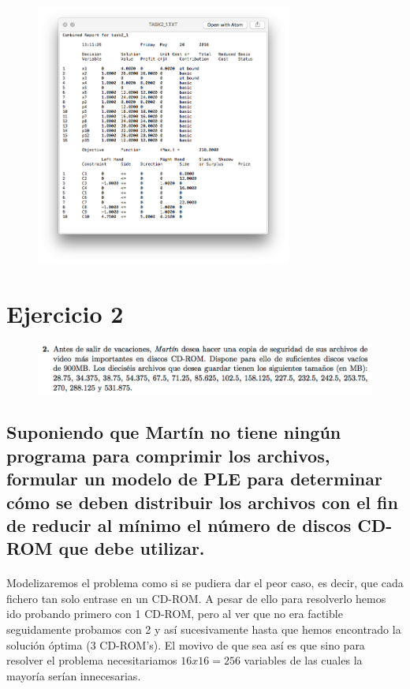 \documentclass[10pt, a4paper]{article}
\begin{document}
			\paragraph{}
			\begin{figure}[H]
			\centering
				\includegraphics[width=0.75\textwidth]{res/exercise-1-result.png}
			\end{figure}


	\section{Ejercicio 2}

        \begin{figure}[H]
        \centering
            \includegraphics[width=\textwidth]{res/exercise-2.png}
        \end{figure}


		\subsection{Suponiendo que Martín no tiene ningún programa para comprimir los archivos, formular un modelo de PLE para determinar cómo se deben distribuir los archivos con el fin de reducir al mínimo el número de discos CD-ROM que debe utilizar.}

			\paragraph{}
			Modelizaremos el problema como si se pudiera dar el peor caso, es decir, que cada fichero tan solo entrase en un CD-ROM. A pesar de ello para resolverlo hemos ido probando primero con 1 CD-ROM, pero al ver que no era factible seguidamente probamos con 2 y así sucesivamente hasta que hemos encontrado la solución óptima (3 CD-ROM's). El movivo de que sea así es que sino para resolver el problema necesitariamos $16 x 16 = 256$ variables de las cuales la mayoría serían innecesarias.
\end{document}
